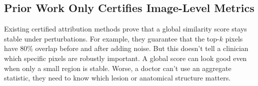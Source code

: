 \documentclass[11pt]{article}
\begin{document}



\subsection{Prior Work Only Certifies Image-Level Metrics}

Existing certified attribution methods \citep{levine2019certifiably, wang2023practical} prove that a global similarity score stays stable under perturbations. For example, they guarantee that the top-$k$ pixels have 80\% overlap before and after adding noise. But this doesn't tell a clinician which specific pixels are robustly important. A global score can look good even when only a small region is stable. Worse, a doctor can't use an aggregate statistic, they need to know which lesion or anatomical structure matters.
\end{document}
